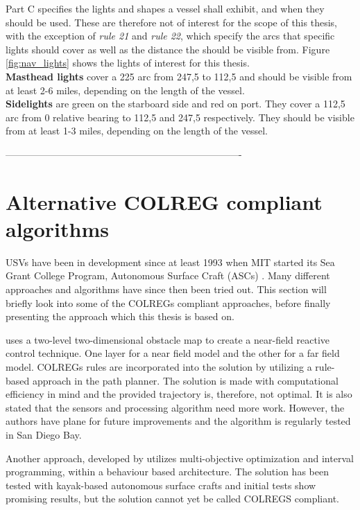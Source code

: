 Part C specifies the lights and shapes a vessel shall exhibit, and when they should be used. These are therefore not of interest for the scope of this thesis, with the exception of \textit{rule 21} and \textit{rule 22}, which specify the arcs that specific lights should cover as well as the distance the should be visible from. Figure \ref{fig:nav_lights} shows the lights of interest for this thesis.
\\
\textbf{Masthead lights} cover a 225 \textdegree arc from 247,5 \textdegree to 112,5 \textdegree and should be visible from at least 2-6 miles, depending on the length of the vessel.\\
\textbf{Sidelights} are green on the starboard side and red on port. They cover a 112,5 arc from 0 relative bearing to 112,5 and 247,5 respectively. They should be visible from at least 1-3 miles, depending on the length of the vessel.

-------------------------------------------------------------------------

\chapter{Alternative COLREG compliant algorithms}
USVs have been in development since at least 1993 when MIT started its Sea Grant College Program, Autonomous Surface Craft (ASCs) \cite{manley2008unmanned}. Many different approaches and algorithms have since then been tried out. This section will briefly look into some of the COLREGs compliant approaches, before finally presenting the approach which this thesis is based on.


\textcite{larson2007advances} uses a two-level two-dimensional obstacle map to create a near-field reactive control technique. One layer for a near field model and the other for a far field model. COLREGs rules are incorporated into the solution by utilizing a rule-based approach in the path planner. The solution is made with computational efficiency in mind and the provided trajectory is, therefore, not optimal. It is also stated that the sensors and processing algorithm need more work. However, the authors have plane for future improvements and the algorithm is regularly tested in San Diego Bay.


Another approach, developed by \textcite{benjamin2004colregs,benjamin2006method} utilizes multi-objective optimization and interval programming, within a behaviour based architecture. The solution has been tested with kayak-based autonomous surface crafts and initial tests show promising results, but the solution cannot yet be called COLREGS compliant.


